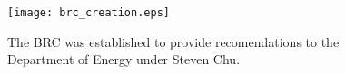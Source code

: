 \begin{figure}[htbp!]
  \begin{center}
    \texttt{[image: brc\_creation.eps]}
  \end{center}
  \caption{The BRC was established to provide recomendations to the Department 
  of Energy under Steven Chu.}
  \label{fig:brc_creation}
\end{figure}
